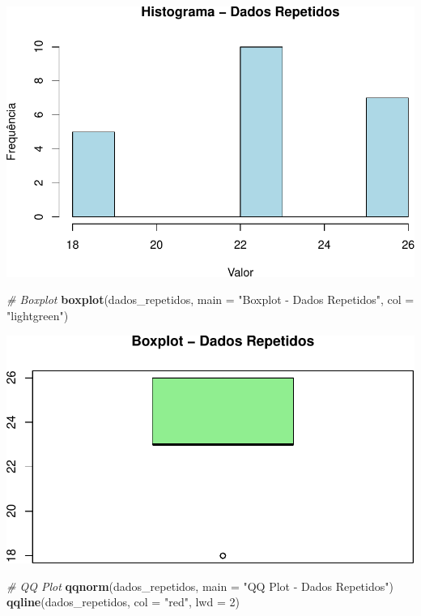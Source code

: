 \documentclass[
]{book}
\newenvironment{Shaded}{\begin{snugshade}}{\end{snugshade}}
\newcommand{\AttributeTok}[1]{\textcolor[rgb]{0.13,0.29,0.53}{#1}}
\newcommand{\CommentTok}[1]{\textcolor[rgb]{0.56,0.35,0.01}{\textit{#1}}}
\newcommand{\DecValTok}[1]{\textcolor[rgb]{0.00,0.00,0.81}{#1}}
\newcommand{\FunctionTok}[1]{\textcolor[rgb]{0.13,0.29,0.53}{\textbf{#1}}}
\newcommand{\NormalTok}[1]{#1}
\newcommand{\StringTok}[1]{\textcolor[rgb]{0.31,0.60,0.02}{#1}}
\begin{document}
\includegraphics{LivroEstatisticaR_files/figure-latex/dados_repetidos_dist-1.pdf}

\begin{Shaded}
\begin{Highlighting}[]
\CommentTok{\# Boxplot}
\FunctionTok{boxplot}\NormalTok{(dados\_repetidos, }\AttributeTok{main =} \StringTok{"Boxplot {-} Dados Repetidos"}\NormalTok{, }\AttributeTok{col =} \StringTok{"lightgreen"}\NormalTok{)}
\end{Highlighting}
\end{Shaded}

\includegraphics{LivroEstatisticaR_files/figure-latex/dados_repetidos_dist-2.pdf}

\begin{Shaded}
\begin{Highlighting}[]
\CommentTok{\# QQ Plot}
\FunctionTok{qqnorm}\NormalTok{(dados\_repetidos, }\AttributeTok{main =} \StringTok{"QQ Plot {-} Dados Repetidos"}\NormalTok{)}
\FunctionTok{qqline}\NormalTok{(dados\_repetidos, }\AttributeTok{col =} \StringTok{"red"}\NormalTok{, }\AttributeTok{lwd =} \DecValTok{2}\NormalTok{)}
\end{Highlighting}
\end{Shaded}
\end{document}
